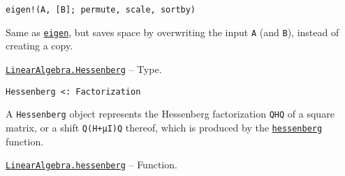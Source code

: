 \begin{adjustwidth}{2em}{0pt}


\begin{verbatim}
eigen!(A, [B]; permute, scale, sortby)
\end{verbatim}

Same as \hyperlink{11056016707394839114}{\texttt{eigen}}, but saves space by overwriting the input \texttt{A} (and \texttt{B}), instead of creating a copy.



\end{adjustwidth}
\hypertarget{17562496283230520715}{}
\hyperlink{17562496283230520715}{\texttt{LinearAlgebra.Hessenberg}}  -- {Type.}

\begin{adjustwidth}{2em}{0pt}


\begin{verbatim}
Hessenberg <: Factorization
\end{verbatim}

A \texttt{Hessenberg} object represents the Hessenberg factorization \texttt{QHQ{\textquotesingle}} of a square matrix, or a shift \texttt{Q(H+μI)Q{\textquotesingle}} thereof, which is produced by the \hyperlink{14451165250498024497}{\texttt{hessenberg}} function.



\end{adjustwidth}
\hypertarget{14451165250498024497}{}
\hyperlink{14451165250498024497}{\texttt{LinearAlgebra.hessenberg}}  -- {Function.}

